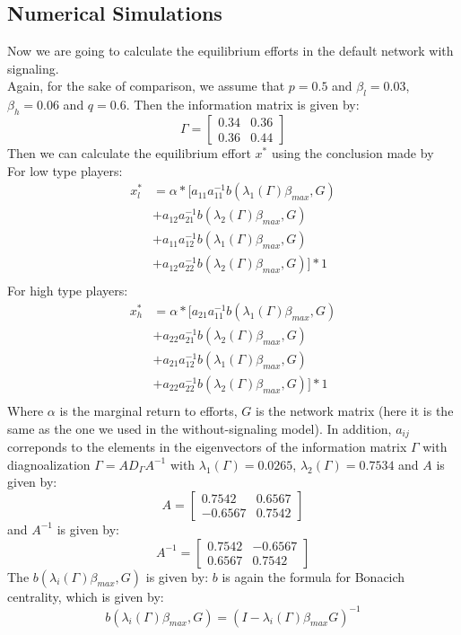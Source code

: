 \documentclass[12pt]{article}
\begin{document}
\subsection*{Numerical Simulations}
Now we are going to calculate the equilibrium efforts in the default network with signaling.\\
Again, for the sake of comparison, we assume that $p=0.5$ and $\beta_l=0.03$, $\beta_h=0.06$ and $q = 0.6$. Then the information matrix is given by:
\[
\Gamma =
\begin{bmatrix}
0.34 & 0.36 \\
0.36 & 0.44
\end{bmatrix}
\]
Then we can calculate the equilibrium effort $x^*$ using the conclusion made by \citep{demarti2015network}\\
For low type players:
\begin{align*}
x_l^* &= \alpha * [a_{11} a_{11}^{-1} b(\lambda_1(\Gamma)\beta_{max},G)\\
&+ a_{12} a_{21}^{-1} b(\lambda_2(\Gamma)\beta_{max},G)\\
&+ a_{11} a_{12}^{-1} b(\lambda_1(\Gamma)\beta_{max},G)\\
&+ a_{12} a_{22}^{-1} b(\lambda_2(\Gamma)\beta_{max},G)] * 1\\
\end{align*}
For high type players:
\begin{align*}
x_h^* &= \alpha * [a_{21} a_{11}^{-1} b(\lambda_1(\Gamma)\beta_{max},G)\\
&+ a_{22} a_{21}^{-1} b(\lambda_2(\Gamma)\beta_{max},G)\\
&+ a_{21} a_{12}^{-1} b(\lambda_1(\Gamma)\beta_{max},G)\\
&+ a_{22} a_{22}^{-1} b(\lambda_2(\Gamma)\beta_{max},G)] * 1 \\
\end{align*}
Where $\alpha$ is the marginal return to efforts, $G$ is the network matrix (here it is the same as the one we used in the without-signaling model). In addition, $a_{ij}$ correponds to the elements in the eigenvectors of the information matrix $\Gamma$ with diagnoalization $\Gamma = A D_\Gamma A^{-1}$ with $\lambda_1(\Gamma) = 0.0265 $, $\lambda_2(\Gamma) = 0.7534$ and $A$ is given by:
\[
A = \begin{bmatrix}
  0.7542 & 0.6567 \\
  -0.6567 & 0.7542
\end{bmatrix}
\]
and $A^{-1}$ is given by:
\[
A^{-1} = \begin{bmatrix}
0.7542 & -0.6567 \\
0.6567 & 0.7542
\end{bmatrix}
\]
  The $b(\lambda_i(\Gamma)\beta_{max},G)$ is given by:
$b$ is again the formula for Bonacich centrality, which is given by:
\[
b(\lambda_i(\Gamma)\beta_{max},G) = (I - \lambda_i(\Gamma)\beta_{max}G)^{-1}
\]
  
\end{document}
